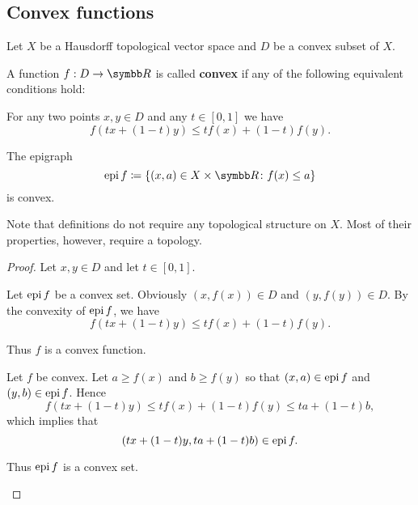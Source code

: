 \subsection{Convex functions}\label{subsec:convex_functions}

Let \( X \) be a Hausdorff topological vector space and \( D \) be a convex subset of \( X \).

\begin{definition}\label{def:convex_functions}
  A function \( f: D \to \BB{R} \) is called \textbf{convex} if any of the following equivalent conditions hold:

  \begin{defenum}
     For any two points \( x, y \in D \) and any \( t \in [0, 1] \) we have
    \begin{equation*}
      f(tx + (1-t)y) \leq tf(x) + (1-t)f(y).
    \end{equation*}

     The epigraph
    \begin{equation*}
      \Epi f \coloneqq \{ (x, a) \in X \times \BB{R} \colon f(x) \leq a \}
    \end{equation*}
    is convex.
  \end{defenum}

  Note that definitions do not require any topological structure on \( X \). Most of their properties, however, require a topology.
\end{definition}
\begin{proof}
  Let \( x, y \in D \) and let \( t \in [0, 1] \).

  \begin{description}
     Let \( \operatorname{epi} f \) be a convex set. Obviously \( (x, f(x)) \in D \) and \( (y, f(y)) \in D \). By the convexity of \( \operatorname{epi} f \), we have
    \begin{equation*}
      f(tx + (1-t)y) \leq tf(x) + (1-t)f(y).
    \end{equation*}

    Thus \( f \) is a convex function.

     Let \( f \) be convex. Let \( a \geq f(x) \) and \( b \geq f(y) \) so that \( (x, a) \in \operatorname{epi} f \) and \( (y, b) \in \operatorname{epi} f \). Hence
    \begin{equation*}
      f(tx + (1-t)y) \leq tf(x) + (1-t)f(y) \leq ta + (1-t)b,
    \end{equation*}
    which implies that
    \begin{equation*}
      (tx + (1-t)y, ta + (1-t)b) \in \operatorname{epi} f.
    \end{equation*}

    Thus \( \operatorname{epi} f \) is a convex set.
  \end{description}
\end{proof}

